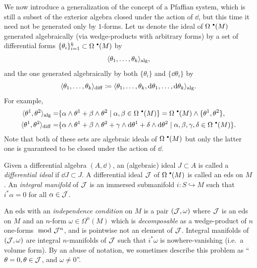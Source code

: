 We now introduce a generalization of the concept of a Pfaffian system, which is still a subset of the exterior algebra closed under the action of $\dd$, but this time it need not be generated only by $1$-forms. Let us denote the ideal of $\Omega^{\smbullet}(M)$ generated algebraically (via wedge-products with arbitrary forms) by a set of differential forms $\{\theta_i\}_{i=1}^k\subset \Omega^{\smbullet }(M)$ by 
\[\langle\theta_1,\ldots,\theta_k\rangle_{\mathrm{alg}},\]
and the one generated algebraically by both $\{\theta_i\}$ and $\{\dd\theta_i\}$ by 
\[\langle\theta_1,\ldots,\theta_k\rangle_{\mathrm{diff}}\coloneqq \langle\theta_1,\ldots,\theta_k,{\mathrm{d}}\theta_1,\ldots,{\mathrm{d}}\theta_k\rangle_{\mathrm{alg}}.\]
For example, 
\begin{align}
    \<\theta^1,\theta^2\>_{\mathrm{alg}}=&\{\alpha\wedge\theta^1+\beta\wedge\theta^2\mid \alpha,\beta\in\Omega^{\smbullet }(M)\}=\Omega^{\smbullet}(M)\wedge\{\theta^1,\theta^2\},\\
    \<\theta^1,\theta^2\>_{\mathrm{diff}}=&\{\alpha\wedge\theta^1+\beta\wedge\theta^2+\gamma\wedge\dd\theta^1+\delta\wedge\dd\theta^2\mid \alpha,\beta,\gamma,\delta\in\Omega^{\smbullet }(M)\}.
\end{align}
Note that both of these sets are algebraic ideals of $\Omega^{\smbullet }(M)$ but only the latter one is guaranteed to be closed under the action of $\dd$.

\begin{defn}
    Given a differential algebra $(A,\dd)$, an (algebraic) ideal $J\subset A$ is called a \emph{differential ideal} if $\dd J\subset J$.
    A differential ideal $\mathcal{J}$ of $\Omega^{\smbullet }(M)$ is called an \gls{eds} on $M$. An \emph{integral manifold} of $\mathcal{J}$ is an immersed submanifold $i:S\hookrightarrow M$ such that $i^\ast\alpha=0$ for all $\alpha\in \mathcal{J}$. 

    An \gls{eds} with an \emph{independence condition} on $M$ is a pair $(\mathcal{J},\omega)$ where $\mathcal{J}$ is an \gls{eds} on $M$ and an $n$-form $\omega\in\Omega^n (M)$ which is \emph{decomposable} as a wedge-product of $n$ one-forms $\ \mathrm{mod}\  \mathcal{J}^n$, and is pointwise not an element of $\mathcal{J}$. Integral manifolds of $(\mathcal{J},\omega)$ are integral $n$-manifolds of $\mathcal{J}$ such that $i^\ast \omega$ is nowhere-vanishing (i.e.\ a volume form). By an abuse of notation, we sometimes describe this problem as ``$\theta=0,\theta\in \mathcal{J}$, and $\omega\neq 0$''.
\end{defn}


